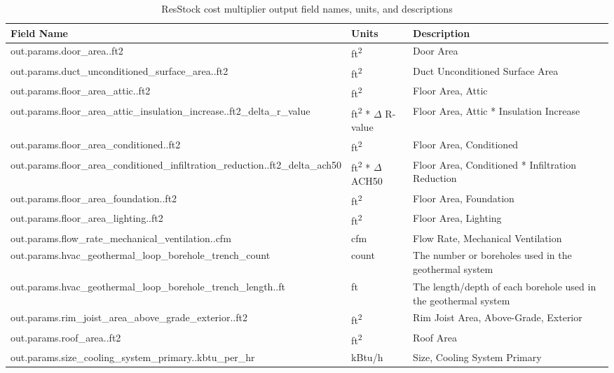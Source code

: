 \begin{longtable}[]{ |p{}|p{2.5cm}|p{6cm}| }
\caption{ResStock cost multiplier output field names, units, and descriptions} \label{table:cost_multipliers} \\
\toprule\noalign{}
\textbf{Field Name} & \textbf{Units} & \textbf{Description} \\
\midrule\noalign{}
\endhead
\bottomrule\noalign{}
\endlastfoot
out.params.door\_area..ft2 & ft\textsuperscript{2} & Door Area \\ \hline
out.params.duct\_unconditioned\_surface\_area..ft2 & ft\textsuperscript{2}& Duct Unconditioned Surface Area \\ \hline
out.params.floor\_area\_attic..ft2 & ft\textsuperscript{2}& Floor Area, Attic \\ \hline
out.params.floor\_area\_attic\_insulation\_increase..ft2\_delta\_r\_value & ft\textsuperscript{2} * $\Delta$ R-value& Floor Area, Attic * Insulation Increase \\ \hline
out.params.floor\_area\_conditioned..ft2 & ft\textsuperscript{2}& Floor Area, Conditioned \\ \hline
out.params.floor\_area\_conditioned\_infiltration\_reduction..ft2\_delta\_ach50 & ft\textsuperscript{2} * $\Delta$ ACH50& Floor Area, Conditioned * Infiltration Reduction \\ \hline
out.params.floor\_area\_foundation..ft2 & ft\textsuperscript{2}& Floor Area, Foundation \\ \hline
out.params.floor\_area\_lighting..ft2 & ft\textsuperscript{2}& Floor Area, Lighting \\ \hline
out.params.flow\_rate\_mechanical\_ventilation..cfm  & cfm & Flow Rate, Mechanical Ventilation \\ \hline
out.params.hvac\_geothermal\_loop\_borehole\_trench\_count  & count & The number or boreholes used in the geothermal system \\ \hline
out.params.hvac\_geothermal\_loop\_borehole\_trench\_length..ft & ft & The length/depth of each borehole used in the geothermal system \\ \hline
out.params.rim\_joist\_area\_above\_grade\_exterior..ft2  & ft\textsuperscript{2}& Rim Joist Area, Above-Grade, Exterior \\ \hline
out.params.roof\_area..ft2  &  ft\textsuperscript{2}& Roof Area \\ \hline
out.params.size\_cooling\_system\_primary..kbtu\_per\_hr  & kBtu/h & Size, Cooling System Primary \\ \hline

\end{longtable}
